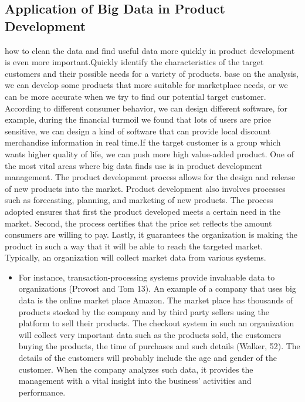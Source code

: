 \documentclass[sigconf]{acmart}
\begin{document}
\subsection{Application of Big Data in Product Development}
how to clean the data and find useful data more quickly in product development is even more important.Quickly identify the characteristics of the target customers and their possible needs for a variety of products. base on the analysis, we can develop some products that more suitable for marketplace needs, or we can be more accurate when we try to find our potential target customer. According to different consumer behavior, we can design different software, for example, during the financial turmoil we found that lots of users are price sensitive, we can design a kind of software that can provide local discount merchandise information in real time.If the target customer is a group which wants higher quality of life, we can push more high value-added product.
One of the most vital areas where big data finds use is in product development management. The product development process allows for the design and release of new products into the market. Product development also involves processes such as forecasting, planning, and marketing of new products. The process adopted ensures that first the product developed meets a certain need in the market. Second, the process certifies that the price set reflects the amount consumers are willing to pay. Lastly, it guarantees the organization is making the product in such a way that it will be able to reach the targeted market. Typically, an organization will collect market data from various systems.

\begin{itemize}

  \item For instance, transaction-processing systems provide invaluable data to organizations (Provost and Tom 13). An example of a company that uses big data is the online market place Amazon. The market place has thousands of products stocked by the company and by third party sellers using the platform to sell their products. The checkout system in such an organization will collect very important data such as the products sold, the customers buying the products, the time of purchases and such details (Walker, 52). The details of the customers will probably include the age and gender of the customer. When the company analyzes such data, it provides the management with a vital insight into the business’ activities and performance.
\end{itemize}
\end{document}
